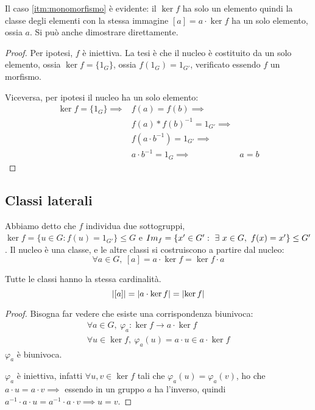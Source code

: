 Il caso \ref{itm:monomorfismo} \`e evidente: il $\ker f$ ha solo un elemento quindi la classe degli elementi con la stessa immagine $[a] = a \cdot \ker f$ ha un solo elemento, ossia $a$. Si pu\`o anche dimostrare direttamente.
\begin{proof}
Per ipotesi, $f$ \`e iniettiva. La tesi \`e che il nucleo \`e costituito da un solo elemento, ossia $\ker f = \{ 1_G \} $, ossia $f(1_G) = 1_{G'}$, verificato essendo $f$ un morfismo.

Viceversa, per ipotesi il nucleo ha un solo elemento:
\begin{align*}
\ker f = \{ 1_G \} \implies & f(a) = f(b) \implies & \\
 & f(a) \ast f(b)^{-1} = 1_{G'} \implies & \\
 & f(a \cdot b^{-1}) = 1_{G'} \implies & \\ 
 & a \cdot b^{-1} = 1_G \implies & a = b
\end{align*}
\end{proof}

\subsection{Classi laterali}

Abbiamo detto che $f$ individua due sottogruppi, $\ker f = \{ u \in G : f(u) = 1_{G'} \} \le G$ e $\image{f} = \{ x' \in G' : \exists x \in G , \ f(x) = x'\} \le G'$. Il nucleo \`e una classe, e le altre classi si costruiscono a partire dal nucleo:
\[
\forall a \in G , \ [a] = a \cdot \ker f = \ker f \cdot a
\]
\begin{prop}
Tutte le classi hanno la stessa cardinalit\`a.
\[
\left\lvert{[a]}\right\rvert = \left\lvert{a \cdot \ker f}\right\rvert = \left\lvert{\ker f}\right\rvert
\]
\end{prop}
\begin{proof}
Bisogna far vedere che esiste una corrispondenza biunivoca:
\begin{gather*}
\forall a \in G , \ \varphi_a : \ker f \to a \cdot \ker f \\
\forall u \in \ker f , \ \varphi_a (u) = a \cdot u \in a \cdot \ker f
\end{gather*}
$\varphi_a$ \`e biunivoca. 

$\varphi_a$ \`e iniettiva, infatti $\forall u, v \in \ker f $ tali che $\varphi_a (u) = \varphi_a (v)$, ho che $a \cdot u = a \cdot v \implies$ essendo in un gruppo $a$ ha l'inverso, quindi $a^{-1} \cdot a \cdot u = a^{-1} \cdot a \cdot v \implies u = v$.
\end{proof}

